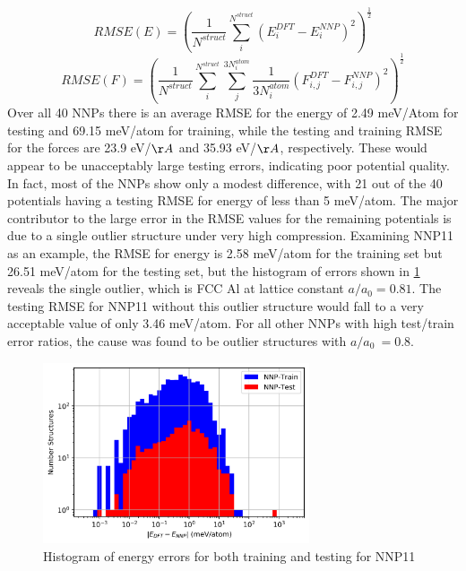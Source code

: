 \documentclass{article}
\begin{document}
\begin{equation}
    RMSE(E) = (\frac{1}{N^{struct}}\sum_i^{N^{struct}} (E^{DFT}_i - E^{NNP}_i)^2)^\frac{1}{2}
\end{equation}
\begin{equation}
        RMSE(F) = (\frac{1}{N^{struct}}\sum_i^{N^{struct}}\sum_j^{3N^{atom}_i}\frac{1}{3N^{atom}_i} (F^{DFT}_{i,j} - F^{NNP}_{i,j})^2)^\frac{1}{2}
\end{equation}
Over all 40 NNPs there is an average RMSE for the energy of 2.49 meV/Atom for testing and 69.15 meV/atom for training, while the testing and training RMSE for the forces are 23.9 eV/$\AA$ and 35.93 eV/$\AA$, respectively.  These would appear to be unacceptably large testing errors, indicating poor potential quality.  In fact, most of the NNPs show only a modest difference, with 21 out of the 40 potentials having a testing RMSE for energy of less than 5 meV/atom.  The major contributor to the large error in the RMSE values for the remaining potentials is due to a single outlier structure under very high compression.  Examining NNP11 as an example, the  RMSE for energy is 2.58 meV/atom for the training set but 26.51 meV/atom for the testing set, but the histogram of errors shown in \ref{fig:rmse_histogram} reveals the single outlier, which is FCC Al at lattice constant $a/a_0 =0.81$.   The testing RMSE for NNP11 without this outlier structure would fall to a very acceptable value of only 3.46 meV/atom.
For all other NNPs with high test/train error ratios, the cause was found to be outlier structures with $a/a_0 ~= 0.8$. 

\begin{figure}[H]
\centering%
\includegraphics[width=0.7\textwidth,center]{figures/plot_nnperrors_histogram.png}%
\caption{Histogram of energy errors for both training and testing for NNP11}%
\label{fig:rmse_histogram}
\end{figure}
\end{document}
